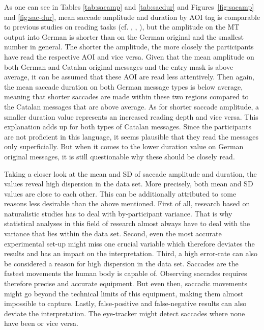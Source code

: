 \documentclass[output=paper,colorlinks,citecolor=brown]{langscibook}
\begin{document}
As one can see in Tables \ref{tab:sacamp} and \ref{tab:sacdur} and Figures~\ref{fig:sacamp} and \ref{fig:sac-dur}, mean saccade amplitude and duration by AOI tag is comparable to previous studies on reading tasks (cf. \citealt[373]{rayner_eye_1998}, \citealt{gangl_lexical_2018}, \citealt{nikolova_binocular_2018}), but the amplitude on the MT output into German is shorter than on the German original and the smallest number in general. The shorter the amplitude, the more closely the participants have read the respective AOI and vice versa. Given that the mean amplitude on both German and Catalan original messages and the entry mask is above average, it can be assumed that these AOI are read less attentively. Then again, the mean saccade duration on both German message types is below average, meaning that shorter saccades are made within these two regions compared to the Catalan messages that are above average. As for shorter saccade amplitude, a smaller duration value represents an increased reading depth and vice versa. This explanation adds up for both types of Catalan messages. Since the participants are not proficient in this language, it seems plausible that they read the messages only superficially. But when it comes to the lower duration value on German original messages, it is still questionable why these should be closely read. 

Taking a closer look at the mean and SD of saccade amplitude and duration, the values reveal high dispersion in the data set. More precisely, both mean and SD values are close to each other. This can be additionally attributed to some reasons less desirable than the above mentioned. First of all, research based on naturalistic studies has to deal with by-participant variance. That is why statistical analyses in this field of research almost always have to deal with the variance that lies within the data set. Second, even the most accurate experimental set-up might miss one crucial variable which therefore deviates the results and has an impact on the interpretation. Third, a high error-rate can also be considered a reason for high dispersion in the data set. Saccades are the fastest movements the human body is capable of. Observing saccades requires therefore precise and accurate equipment. But even then, saccadic movements might go beyond the technical limits of this equipment, making them almost impossible to capture. Lastly, false-positive and false-negative results can also deviate the interpretation. The eye-tracker might detect saccades where none have been or vice versa.
\end{document}
